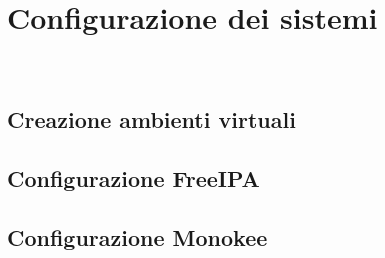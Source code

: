 
\chapter{Configurazione dei sistemi}
\label{cap:configurazione-sistemi}

\\

\section{Creazione ambienti virtuali}

\section{Configurazione FreeIPA}

\section{Configurazione Monokee}